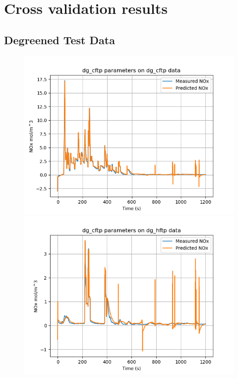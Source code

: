 \newpage
\section{Cross validation results}

\subsection{Degreened Test Data}

\begin{figure}[H]
        \begin{minipage}{0.33\textwidth}
                \includegraphics[width = \textwidth]{./figs/figs_new_mdl/dg_cftp_dg_cftp.png}
        \end{minipage}
        \begin{minipage}{0.33\textwidth}
                \includegraphics[width = \textwidth]{./figs/figs_new_mdl/dg_cftp_dg_hftp.png}

\end{minipage}
\end{figure}
